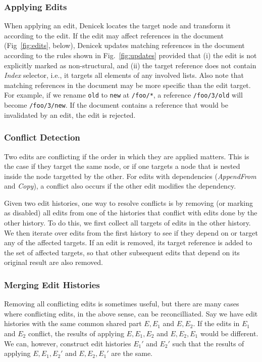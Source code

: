 \documentclass[sigconf]{acmart}
\begin{document}
\subsubsection*{Applying Edits}
When applying an edit, Denicek locates the target node and transform it according to the
edit. If the edit may affect references in the document (Fig~\ref{fig:edits}, below), Denicek
updates matching references in the document according to the rules shown in Fig.~\ref{fig:updates}
provided that (i) the edit is not explicitly marked as non-structural, and (ii) the target
reference does not contain \textit{Index} selector, i.e., it targets all elements of any involved
lists. Also note that matching references in the document may be more specific than the edit
target. For example, if we rename {\small\Verb|old|} to {\small\Verb|new|} at {\small\Verb|/foo/*|},
a reference {\small\Verb|/foo/3/old|} will become {\small\Verb|/foo/3/new|}. If the document
contains a reference that would be invalidated by an edit, the edit is rejected.

\subsubsection*{Conflict Detection}
Two edits are conflicting if the order in which they are applied matters. This is the case if
they target the same node, or if one targets a node that is nested inside the node targetted by
the other. For edits with dependencies (\textit{AppendFrom} and \textit{Copy}), a conflict also
occurs if the other edit modifies the dependency.

Given two edit histories, one way to resolve conflicts is by removing (or marking as disabled) all
edits from one of the histories that conflict with edits done by the other history. To do this,
we first collect all targets of edits in the other history. We then iterate over edits from the first
history to see if they depend on or target any of the affected targets. If an edit is removed,
its target reference is added to the set of affected targets, so that other subsequent edits that depend
on its original result are also removed.

\subsubsection*{Merging Edit Histories}
Removing all conflicting edits is sometimes useful, but there are many cases where conflicting
edits, in the above sense, can be reconcilliated. Say we have edit histories with
the same common shared part $E, E_1$ and $E, E_2$. If the edits in $E_1$ and $E_2$ conflict,
the results of applying $E, E_1, E_2$ and $E, E_2, E_1$ would be different. We can, however,
construct edit histories $E_1'$ and $E_2'$ such that the results of applying $E, E_1, E_2'$ and
$E, E_2, E_1'$ are the same.
\end{document}
